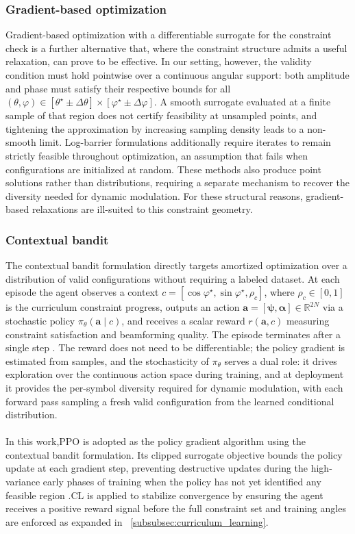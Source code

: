 \subsubsection{Gradient-based optimization}
Gradient-based optimization with a differentiable surrogate for the constraint check is a further alternative that, where the constraint structure admits a useful relaxation, can prove to be effective. In our setting, however, the validity condition must hold pointwise over a continuous angular support: both amplitude and phase must satisfy their respective bounds for all $(\theta, \varphi) \in [\theta^\star \pm \Delta\theta] \times [\varphi^\star \pm \Delta\varphi]$. A smooth surrogate evaluated at a finite sample of that region does not certify feasibility at unsampled points, and tightening the approximation by increasing sampling density leads to a non-smooth limit. Log-barrier formulations additionally require iterates to remain strictly feasible throughout optimization, an assumption that fails when configurations are initialized at random. These methods also produce point solutions rather than distributions, requiring a separate mechanism to recover the diversity needed for dynamic modulation. For these structural reasons, gradient-based relaxations are ill-suited to this constraint geometry.
\subsubsection{Contextual bandit}
The contextual bandit formulation directly targets amortized optimization over a distribution of valid configurations without requiring a labeled dataset. At each episode the agent observes a context $c = [\cos\varphi^\star, \sin\varphi^\star, \rho_c]$, where $\rho_c \in [0,1]$ is the curriculum constraint progress, outputs an action $\mathbf{a} = [\boldsymbol{\psi}, \boldsymbol{\alpha}] \in \mathbb{R}^{2N}$ via a stochastic policy $\pi_\theta(\mathbf{a} \mid c)$, and receives a scalar reward $r(\mathbf{a}, c)$ measuring constraint satisfaction and beamforming quality. The episode terminates after a single step \cite{lattimore2020bandit}. The reward does not need to be differentiable; the policy gradient is estimated from samples, and the stochasticity of $\pi_\theta$ serves a dual role: it drives exploration over the continuous action space during training, and at deployment it provides the per-symbol diversity required for dynamic modulation, with each forward pass sampling a fresh valid configuration from the learned conditional distribution.\\
\\
In this work,\gls{PPO} is adopted as the policy gradient algorithm using the contextual bandit formulation. Its clipped surrogate objective bounds the policy update at each gradient step, preventing destructive updates during the high-variance early phases of training when the policy has not yet identified any feasible region \cite{schulman2017ppo}.\gls{CL} is applied to stabilize convergence by ensuring the agent receives a positive reward signal before the full constraint set and training angles are enforced as expanded in \subsubsectionname~\ref{subsubsec:curriculum_learning}.

